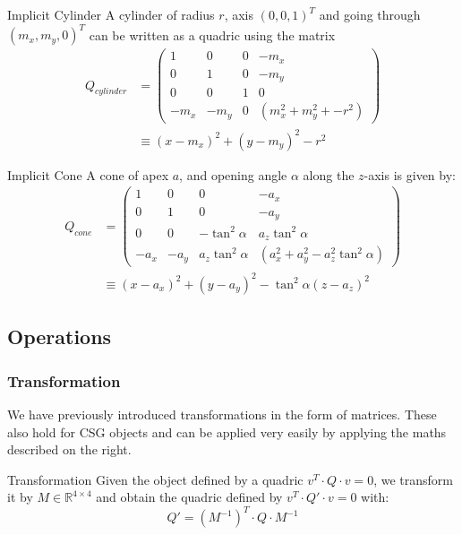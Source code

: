 \documentclass{panikzettel}
\begin{document}
\begin{defi}{Implicit Cylinder}
A cylinder of radius $r$, axis $(0,0,1)^T$ and going through $(m_x,m_y,0)^T$ can be written as a quadric using the matrix
\begin{align*}Q_{cylinder} &=
\begin{pmatrix}
1 & 0 & 0 & -m_x \\
0 & 1 & 0 & -m_y \\
0 & 0 & 1 & 0 \\
-m_x & -m_y & 0 & (m_x^2 + m_y^2 + - r^2)
\end{pmatrix} \\
&\equiv (x-m_x)^2 + (y-m_y)^2 - r^2
\end{align*}
\end{defi}

\begin{defi}{Implicit Cone}
A cone of apex $a$, and opening angle $\alpha$ along the $z$-axis is given by:
\begin{align*}Q_{cone} &=
\begin{pmatrix}
1 & 0 & 0 & -a_x \\
0 & 1 & 0 & -a_y \\
0 & 0 & -\tan^2 \alpha & a_z \tan^2 \alpha \\
-a_x & -a_y & a_z \tan^2 \alpha & (a_x^2 + a_y^2 - a_z^2 \tan^2 \alpha)
\end{pmatrix} \\
&\equiv (x-a_x)^2 + (y-a_y)^2 - \tan^2 \alpha (z-a_z)^2
\end{align*}
\end{defi}

\begin{halfboxl}
\vspace{-\baselineskip}
\subsection{Operations}

\subsubsection*{Transformation}

We have previously introduced transformations in the form of matrices. These also hold for CSG objects and can be applied very easily by applying the maths described on the right.
\end{halfboxl}%
\begin{halfboxr}
\vspace{-\baselineskip}
\begin{defi}{Transformation}
Given the object defined by a quadric $v^T \cdot Q \cdot v = 0$, we transform it by $M \in \mathbb{R}^{4 \times 4}$ and obtain the quadric defined by $v^T \cdot Q' \cdot v = 0$ with:
$$Q' = (M^{-1})^T \cdot Q \cdot M^{-1}$$
\end{defi}
\end{halfboxr}
\end{document}
